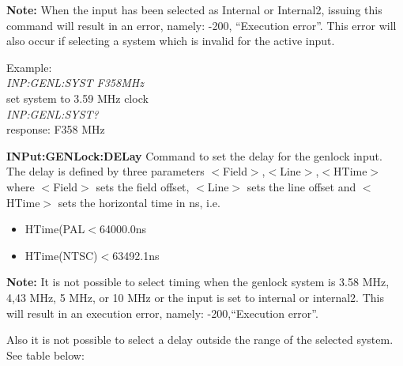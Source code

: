 \textbf{Note:} When the input has been selected as Internal or Internal2, issuing this command will result in an error, namely: -200, ``Execution error''. This error will also occur if selecting a system which is invalid for the active input.

Example:\\
\textit{INP:GENL:SYST F358MHz}\\
set system to 3.59 MHz clock\\
\textit{INP:GENL:SYST?}\\
response: F358 MHz

\textbf{INPut:GENLock:DELay}
Command to set the delay for the genlock input. The delay is defined by three parameters $<$Field$>$,$<$Line$>$,$<$HTime$>$
where $<$Field$>$ sets the field offset, $<$Line$>$ sets the line offset and $<$HTime$>$ sets the horizontal time in ns, i.e.

\begin{itemize}
\item HTime(PAL$<$64000.0ns 
\item HTime(NTSC)$<$63492.1ns
\end{itemize}

\textbf{Note:} It is not possible to select timing when the genlock system is 3.58 MHz, 4,43 MHz, 5 MHz, or 10 MHz or the input is set to internal or internal2. This will result in an execution error, namely: -200,``Execution error''. 

Also it is not possible to select a delay outside the range of the selected system. See table below:

